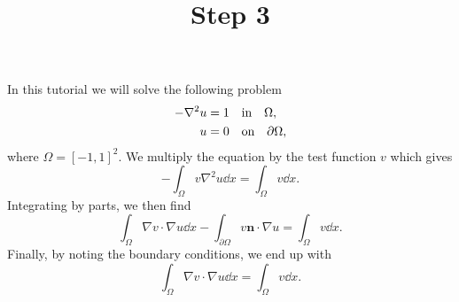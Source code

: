 \documentclass{../notes}
\title{Step 3}
\begin{document}
\maketitle

In this tutorial we will solve the following problem
\begin{align}
    -\nabla^2 u &= 1 \quad \text{in} \quad \Omega,\\
    u &= 0 \quad \text{on} \quad \partial\Omega,
\end{align}
where $\Omega=[-1, 1]^2$. We multiply the equation by the test function $v$
which gives
\begin{equation}
    -\int_\Omega v \nabla^2u \dd{x} = \int_\Omega v\dd{x}.
\end{equation}
Integrating by parts, we then find
\begin{equation}
    \int_\Omega \nabla v \cdot \nabla u \dd{x}
    -\int_{\partial\Omega}v\mathbf{n}\cdot\nabla u = \int_\Omega v\dd{x}.
\end{equation}
Finally, by noting the boundary conditions, we end up with
\begin{equation}
    \int_\Omega \nabla v \cdot \nabla u \dd{x}
    = \int_\Omega v\dd{x}.
\end{equation}
\end{document}
